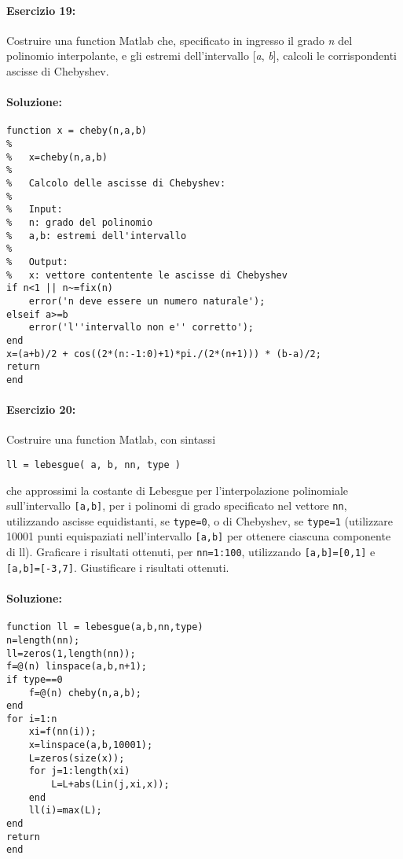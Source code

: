 \documentclass[12pt]{article}
\begin{document}
\paragraph{Esercizio 19:}
Costruire una function Matlab che, specificato in ingresso il grado \emph{n} del polinomio
interpolante, e gli estremi dell'intervallo [\emph{a}, \emph{b}], calcoli le corrispondenti ascisse di Chebyshev.

\paragraph{Soluzione:}
\begin{lstlisting}[frame=single]
function x = cheby(n,a,b)
%
%   x=cheby(n,a,b)
%
%   Calcolo delle ascisse di Chebyshev:
%
%   Input:
%   n: grado del polinomio
%   a,b: estremi dell'intervallo
%
%   Output:
%   x: vettore contentente le ascisse di Chebyshev
if n<1 || n~=fix(n)
    error('n deve essere un numero naturale');
elseif a>=b
    error('l''intervallo non e'' corretto');
end
x=(a+b)/2 + cos((2*(n:-1:0)+1)*pi./(2*(n+1))) * (b-a)/2;
return
end
\end{lstlisting}
\paragraph{Esercizio 20:}
Costruire una function Matlab, con sintassi
\begin{center}
    \texttt{ll = lebesgue( a, b, nn, type )}
\end{center}
che approssimi la costante di Lebesgue per l'interpolazione polinomiale sull'intervallo \texttt{[a,b]}, per
i polinomi di grado specificato nel vettore \texttt{nn}, utilizzando ascisse equidistanti, se \texttt{type=0}, o di
Chebyshev, se \texttt{type=1} (utilizzare 10001 punti equispaziati nell'intervallo \texttt{[a,b]} per ottenere ciascuna componente di ll). 
Graficare i risultati ottenuti, per \texttt{nn=1:100}, utilizzando \texttt{[a,b]=[0,1]} e \texttt{[a,b]=[-3,7]}. Giustificare i risultati ottenuti.

\paragraph{Soluzione:}

\begin{lstlisting}[frame=single]
function ll = lebesgue(a,b,nn,type)
n=length(nn);
ll=zeros(1,length(nn));
f=@(n) linspace(a,b,n+1);
if type==0
    f=@(n) cheby(n,a,b);
end
for i=1:n
    xi=f(nn(i));
    x=linspace(a,b,10001);
    L=zeros(size(x));
    for j=1:length(xi)
        L=L+abs(Lin(j,xi,x));
    end
    ll(i)=max(L);
end
return
end
\end{lstlisting}
\end{document}
